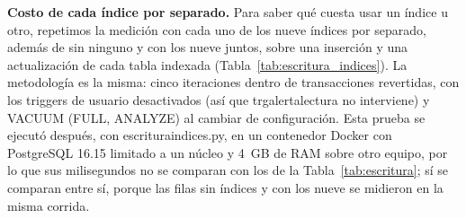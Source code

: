 \documentclass[11pt,letterpaper]{article}
\newcommand{\tbus}{\textunderscore\allowbreak}
\newcommand{\tb}[1]{{\ttfamily\let\_\tbus #1}}
\begin{document}
\textbf{Costo de cada índice por separado.} Para saber qué cuesta usar un índice u otro, repetimos la medición con cada uno de los nueve índices por separado, además de sin ninguno y con los nueve juntos, sobre una inserción y una actualización de cada tabla indexada (Tabla~\ref{tab:escritura_indices}). La metodología es la misma: cinco iteraciones dentro de transacciones revertidas, con los triggers de usuario desactivados (así que \tb{trg\_alerta\_lectura} no interviene) y \tb{VACUUM (FULL, ANALYZE)} al cambiar de configuración. Esta prueba se ejecutó después, con \tb{escritura\_indices.py}, en un contenedor Docker con PostgreSQL 16.15 limitado a un núcleo y 4~GB de RAM sobre otro equipo, por lo que sus milisegundos no se comparan con los de la Tabla~\ref{tab:escritura}; sí se comparan entre sí, porque las filas sin índices y con los nueve se midieron en la misma corrida.
\end{document}
